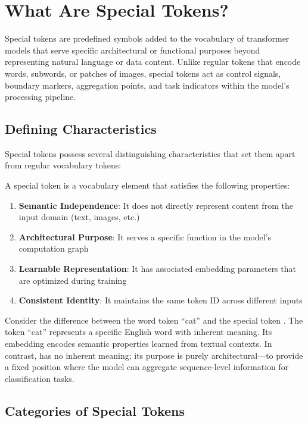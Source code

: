 \section{What Are Special Tokens?}

Special tokens are predefined symbols added to the vocabulary of transformer models that serve specific architectural or functional purposes beyond representing natural language or data content. Unlike regular tokens that encode words, subwords, or patches of images, special tokens act as control signals, boundary markers, aggregation points, and task indicators within the model's processing pipeline.

\subsection{Defining Characteristics}

Special tokens possess several distinguishing characteristics that set them apart from regular vocabulary tokens:

\begin{definition}
A special token is a vocabulary element that satisfies the following properties:
\begin{enumerate}
\item \textbf{Semantic Independence}: It does not directly represent content from the input domain (text, images, etc.)
\item \textbf{Architectural Purpose}: It serves a specific function in the model's computation graph
\item \textbf{Learnable Representation}: It has associated embedding parameters that are optimized during training
\item \textbf{Consistent Identity}: It maintains the same token ID across different inputs
\end{enumerate}
\end{definition}

Consider the difference between the word token ``cat'' and the special token \cls{}. The token ``cat'' represents a specific English word with inherent meaning. Its embedding encodes semantic properties learned from textual contexts. In contrast, \cls{} has no inherent meaning; its purpose is purely architectural---to provide a fixed position where the model can aggregate sequence-level information for classification tasks.

\subsection{Categories of Special Tokens}

